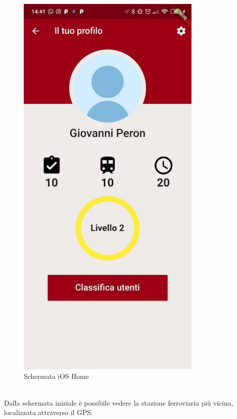 \hfill
\begin{minipage}{0.45\textwidth}
\begin{figure}[H]
	\centering
	\includegraphics[width=0.8\textwidth]{immagini/profile.jpg}
	\caption{Schermata iOS Home}
\end{figure}
\end{minipage}
\vspace{1cm}
\\Dalla schermata iniziale è possibile vedere la stazione ferroviaria più vicina, localizzata attraverso il GPS.
